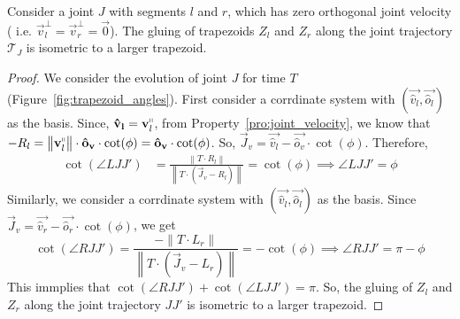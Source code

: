 \begin{lemma}
\label{lem:trapezoid_gluing_parallel}
Consider a joint $J$ with segments $l$ and $r$,
which has zero orthogonal joint velocity ( i.e. $\vec v_l^\perp = \vec v_r^\perp = \vec 0$).
The gluing of trapezoids $Z_l$ and $Z_r$ along the joint trajectory $\mathcal T_J$ is isometric to a larger trapezoid.
\end{lemma}
\begin{proof}
We consider the evolution of joint $J$ for time $T$ (Figure~\ref{fig:trapezoid_angles}).
First consider a corrdinate system with $(\vec{\hat v_l}, \vec{\hat o_l})$ as the basis.
Since, $\vec{\hat v_l} = \vec v_l^\shortparallel$, from Property~\ref{pro:joint_velocity},
we know that $-R_l = \left\| \vec v_l^\shortparallel\right\|\cdot\vec{\hat o_v}\cdot\cot(\phi) = \vec{\hat o_v}\cdot\cot(\phi)$.
So, $\vec J_v = \vec{\hat v_l} - \vec{\hat o_v}\cdot\cot(\phi)$.  Therefore,
\begin{align}
    \cot(\angle LJJ') &= \frac{\left\| T\cdot R_l\right\|}{ \left\| T\cdot(\vec J_v - R_l)\right\|} = \cot(\phi)
    \implies \angle LJJ' = \phi
\end{align}
Similarly, we consider a corrdinate system with $(\vec{\hat v_l}, \vec{\hat o_l})$ as the basis.
Since $\vec J_v = \vec{\hat v_r} - \vec{\hat o_r}\cdot \cot(\phi)$, we get
$$
\cot(\angle RJJ') = \frac{-\left\| T\cdot L_r\right\|}{ \left\| T\cdot(\vec J_v - L_r)\right\|} = -\cot(\phi)
\implies \angle RJJ' = \pi - \phi
$$
This immplies that $\cot(\angle RJJ') + \cot(\angle LJJ') = \pi$.
So, the gluing of $Z_l$ and $Z_r$ along the joint trajectory $JJ'$ is isometric to a larger trapezoid.
\end{proof}

